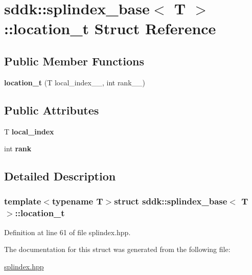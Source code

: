 \hypertarget{structsddk_1_1splindex__base_1_1location__t}{}\section{sddk\+:\+:splindex\+\_\+base$<$ T $>$\+:\+:location\+\_\+t Struct Reference}
\label{structsddk_1_1splindex__base_1_1location__t}
\subsection*{Public Member Functions}
\begin{DoxyCompactItemize}
\item 
\hypertarget{structsddk_1_1splindex__base_1_1location__t_a8b0146fc42f3a9e5653cd9258140a4c7}{}{\bfseries location\+\_\+t} (T local\+\_\+index\+\_\+\+\_\+, int rank\+\_\+\+\_\+)\label{structsddk_1_1splindex__base_1_1location__t_a8b0146fc42f3a9e5653cd9258140a4c7}

\end{DoxyCompactItemize}
\subsection*{Public Attributes}
\begin{DoxyCompactItemize}
\item 
\hypertarget{structsddk_1_1splindex__base_1_1location__t_a16b7fdcd7bdcae40b2313fc28e67d343}{}T {\bfseries local\+\_\+index}\label{structsddk_1_1splindex__base_1_1location__t_a16b7fdcd7bdcae40b2313fc28e67d343}

\item 
\hypertarget{structsddk_1_1splindex__base_1_1location__t_aed848eda8a91b20ec27d00dc7589355d}{}int {\bfseries rank}\label{structsddk_1_1splindex__base_1_1location__t_aed848eda8a91b20ec27d00dc7589355d}

\end{DoxyCompactItemize}


\subsection{Detailed Description}
\subsubsection*{template$<$typename T$>$struct sddk\+::splindex\+\_\+base$<$ T $>$\+::location\+\_\+t}



Definition at line 61 of file splindex.\+hpp.



The documentation for this struct was generated from the following file\+:\begin{DoxyCompactItemize}
\item 
\hyperlink{splindex_8hpp}{splindex.\+hpp}\end{DoxyCompactItemize}
